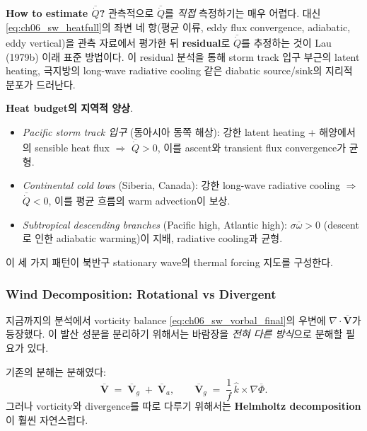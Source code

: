 \medskip



\noindent\textbf{How to estimate $\overline{\dot{Q}}$?}
관측적으로 $\overline{\dot{Q}}$를 \emph{직접} 측정하기는 매우 어렵다.
대신 \eqref{eq:ch06_sw_heatfull}의 좌변 네 항(평균 이류, eddy flux convergence, adiabatic, eddy vertical)을
관측 자료에서 평가한 뒤 \textbf{residual}로 $\overline{\dot{Q}}$를 추정하는 것이
Lau (1979b) 이래 표준 방법이다.
이 residual 분석을 통해 storm track 입구 부근의 latent heating,
극지방의 long-wave radiative cooling 같은 diabatic source/sink의 지리적 분포가 드러난다.

\begin{hisublock}
\textbf{Heat budget의 지역적 양상}.
\begin{itemize}
  \item \emph{Pacific storm track 입구} (동아시아 동쪽 해상):
        강한 latent heating + 해양에서의 sensible heat flux $\Rightarrow$
        $\overline{\dot{Q}} > 0$, 이를 ascent와 transient flux convergence가 균형.
  \item \emph{Continental cold lows} (Siberia, Canada):
        강한 long-wave radiative cooling $\Rightarrow$ $\overline{\dot{Q}} < 0$,
        이를 평균 흐름의 warm advection이 보상.
  \item \emph{Subtropical descending branches} (Pacific high, Atlantic high):
        $\sigma\overline{\omega} > 0$ (descent로 인한 adiabatic warming)이 지배,
        radiative cooling과 균형.
\end{itemize}
이 세 가지 패턴이 북반구 stationary wave의 thermal forcing 지도를 구성한다.
\end{hisublock}

\subsubsection{Wind Decomposition: Rotational vs Divergent}

지금까지의 분석에서 vorticity balance \eqref{eq:ch06_sw_vorbal_final}의 우변에
$\nabla\!\cdot\!\overline{\mathbf{V}}$가 등장했다. 이 발산 성분을 분리하기 위해서는
바람장을 \emph{전혀 다른 방식}으로 분해할 필요가 있다.

기존의 분해는  분해였다:
\begin{equation}\label{eq:ch06_sw_geoageo}
  \overline{\mathbf{V}} \;=\; \overline{\mathbf{V}}_g \;+\; \overline{\mathbf{V}}_a ,
  \qquad \overline{\mathbf{V}}_g \;=\; \frac{1}{f}\,\hat{k}\!\times\!\nabla\overline{\Phi} .
\end{equation}
그러나 vorticity와 divergence를 따로 다루기 위해서는 \textbf{Helmholtz decomposition}이
훨씬 자연스럽다.

